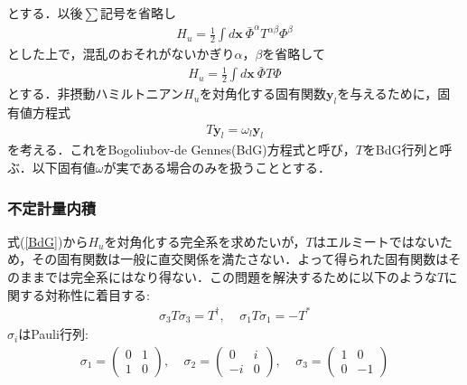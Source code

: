 \documentclass[10.5pt,a4paper]{jreport}
\begin{document}
とする．以後$\sum$記号を省略し
\begin{eqnarray}
  H_u=\frac{1}{2}\int d\bm{x}\ \bar{\Phi}^\alpha T^{\alpha \beta}\Phi^\beta
\end{eqnarray}
とした上で，混乱のおそれがないかぎり$\alpha，\beta$を省略して
\begin{eqnarray}
  H_u=\frac{1}{2}\int d\bm{x}\ \bar{\Phi}T\Phi
\end{eqnarray}
とする．非摂動ハミルトニアン$H_u$を対角化する固有関数$\bm{y}_l$を与えるために，固有値方程式
\begin{eqnarray}
  T\bm{y}_l=\omega_l\bm{y}_l\label{BdG}
\end{eqnarray}
を考える．これをBogoliubov-de Gennes(BdG)方程式と呼び，$T$をBdG行列と呼ぶ．以下固有値$\omega$が実である場合のみを扱うこととする．
\subsubsection{不定計量内積}
式(\ref{BdG})から$H_u$を対角化する完全系を求めたいが，$T$はエルミートではないため，その固有関数は一般に直交関係を満たさない．よって得られた固有関数はそのままでは完全系にはなり得ない．この問題を解決するために以下のような$T$に関する対称性に着目する:
\begin{eqnarray}
  \sigma_3 T \sigma_3 = T^\dagger,\ \ \ \ \ \sigma_1 T\sigma_1 = -T^*\label{symmetry}
\end{eqnarray}
$\sigma_i$はPauli行列:
\begin{eqnarray}
  \sigma_1 =
  \begin{pmatrix}
    0 & 1\\
    1 & 0
  \end{pmatrix}
  ,\ \ \ \ \ 
  \sigma_2 = 
  \begin{pmatrix}
    0 & i\\
    -i & 0
  \end{pmatrix},\ \ \ \ \ 
  \sigma_3 =
  \begin{pmatrix}
    1 & 0\\
    0 & -1
  \end{pmatrix}
\end{eqnarray}
\end{document}

